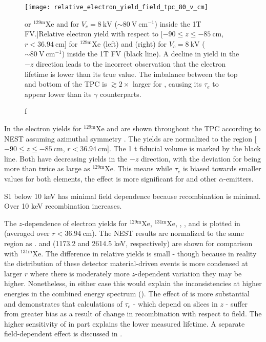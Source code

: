 \begin{figure}
\centering
\texttt{[image: relative\_electron\_yield\_field\_tpc\_80\_v\_cm]}
\caption[Relative electron yield with respect to [$-90 \leq z \leq -85\ \mathrm{cm}$, $r < 36.94\ \mathrm{cm}$] for
$\mathrm{^{129m}Xe}$ and  for $V_c = 8\ \mathrm{kV}$ (${\sim}80\ \mathrm{V\ cm^{-1}}$) inside the 1T FV.]{Relative electron
yield with respect to [$-90 \leq z \leq -85\ \mathrm{cm}$, $r < 36.94\ \mathrm{cm}$] for
$\mathrm{^{129m}Xe}$ (left) and  (right) for $V_c = 8\ \mathrm{kV}$ (${\sim}80\ \mathrm{V\ cm^{-1}}$) inside the 1T FV (black
line).  A decline in yield in the $-z$ direction leads to the incorrect observation that the electron lifetime is lower than its
true value.  The imbalance between the top
and bottom of the TPC is $\gtrsim 2\times$ larger for , causing its $\tau_e$ to appear lower than its $\gamma$ counterparts.}
\label{fig:electron_lifetimes_rn222_vs_kr83m_field_tpc}
\end{figure}

In  the electron yields for $\mathrm{^{129m}Xe}$ and 
are shown throughout the TPC according to NEST assuming azimuthal symmetry .  The yields are normalized to the
region [$-90 \leq z \leq -85\ \mathrm{cm}$,
$r < 36.94\ \mathrm{cm}$].  The 1 t fiducial volume is marked by the black line.  Both have decreasing yields in the $-z$ direction,
with the deviation for  being more than twice as large as $\mathrm{^{129m}Xe}$.  This means while $\tau_e$ is biased towards
smaller values for both elements, the effect is more significant for  and other $\alpha$-emitters.

S1 below 10 keV has minimal field dependence because recombination is minimal.  Over 10 keV recombination increases.

The $z$-dependence of electron yields for $\mathrm{^{129m}Xe}$, $\mathrm{^{131m}Xe}$, , , and  is
plotted in  (averaged over $r < 36.94\ \mathrm{cm}$).  The NEST results are
normalized to the same region as .   and  (1173.2 and
2614.5 keV, respectively) are shown for comparison with $\mathrm{^{131m}Xe}$.  The difference in relative yields is
small - though because in reality the distribution of these detector material-driven events is more condensed at larger $r$ where there
is moderately more $z$-dependent variation they may be higher.  Nonetheless, in either case this
would explain the inconsistencies at higher energies in the combined energy spectrum
().  The
effect of  is more substantial and demonstrates that calculations of $\tau_e$ - which depend on slices in $z$ - suffer from
greater bias as a result of change in recombination with respect to field.  The higher sensitivity of \alphadecays in part explains
the lower measured lifetime.  A separate field-dependent effect is discussed in .

